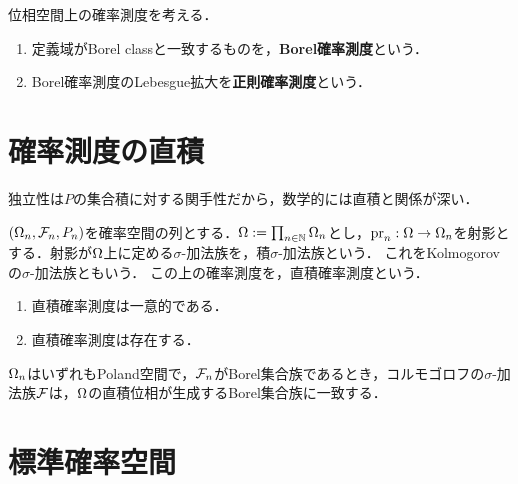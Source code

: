 \documentclass[uplatex,dvipdfmx]{jsreport}
\begin{document}
\begin{definition}\label{def-regular-measure}
    位相空間上の確率測度を考える．
    \begin{enumerate}
        \item 定義域がBorel classと一致するものを，\textbf{Borel確率測度}という．
        \item Borel確率測度のLebesgue拡大を\textbf{正則確率測度}という．
    \end{enumerate}
\end{definition}

\section{確率測度の直積}

\begin{tcolorbox}[colframe=ForestGreen, colback=ForestGreen!10!white,breakable,colbacktitle=ForestGreen!40!white,coltitle=black,fonttitle=\bfseries\sffamily,
title=]
    独立性は$P$の集合積に対する関手性だから，数学的には直積と関係が深い．
\end{tcolorbox}

\begin{definition}
    $(\Omega_n,\mathcal{F}_n,P_n)$を確率空間の列とする．$\Omega:=\prod_{n\in\mathbb{N}}\Omega_n$とし，$\mathrm{pr}_n:\Omega\to\Omega_n$を射影とする．射影が$\Omega$上に定める$\sigma$-加法族を，積$\sigma$-加法族という．
    これをKolmogorovの$\sigma$-加法族ともいう．
    この上の確率測度を，直積確率測度という．
\end{definition}

\begin{lemma}\mbox{}
    \begin{enumerate}
        \item 直積確率測度は一意的である．
        \item 直積確率測度は存在する．
    \end{enumerate}
\end{lemma}

\begin{theorem}\label{thm-product-sigma-algebra}
    $\Omega_n$はいずれもPoland空間で，$\mathcal{F}_n$がBorel集合族であるとき，コルモゴロフの$\sigma$-加法族$\mathcal{F}$は，$\Omega$の直積位相が生成するBorel集合族に一致する．
\end{theorem}

\section{標準確率空間}
\end{document}
